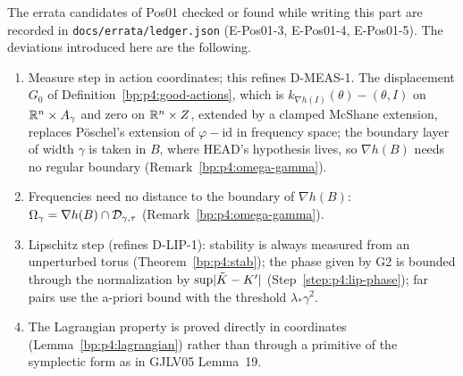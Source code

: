 \begin{remark}\label{bp:p4:deviations}
The errata candidates of Pos01 checked or found while writing this part are recorded in
\texttt{docs/errata/ledger.json} (E-Pos01-3, E-Pos01-4, E-Pos01-5). The deviations introduced here are the
following.
\begin{enumerate}[label=(V\arabic*)]
\item Measure step in action coordinates; this refines D-MEAS-1. The displacement $G_0$ of
  Definition~\ref{bp:p4:good-actions}, which is $k_{\nabla h(I)}(\theta)-(\theta,I)$ on
  $\mathbb{R}^n\times A_\gamma$ and zero on $\mathbb{R}^n\times Z$, extended by a clamped McShane extension, replaces
  Pöschel's extension of
  $\varphi-\mathrm{id}$ in frequency space; the boundary layer of width $\gamma$ is taken in $B$, where
  HEAD's hypothesis lives, so $\nabla h(B)$ needs no regular boundary
  (Remark~\ref{bp:p4:omega-gamma}).
\item Frequencies need no distance to the boundary of $\nabla h(B)$: $\Omega_\gamma=\nabla h(B)\cap\mathcal{D}_{\gamma,\tau}$
  (Remark~\ref{bp:p4:omega-gamma}).
\item Lipschitz step (refines D-LIP-1): stability is always measured from an unperturbed torus
  (Theorem~\ref{bp:p4:stab}); the phase given by G2 is bounded through the normalization by
  $\sup\lvert \tilde K-K'\rvert$ (Step~\ref{step:p4:lip-phase}); far pairs use the a-priori bound with the
  threshold $\lambda_*\gamma^2$.
\item The Lagrangian property is proved directly in coordinates (Lemma~\ref{bp:p4:lagrangian})
  rather than through a primitive of the symplectic form as in GJLV05 Lemma~19.
\end{enumerate}
\end{remark}
